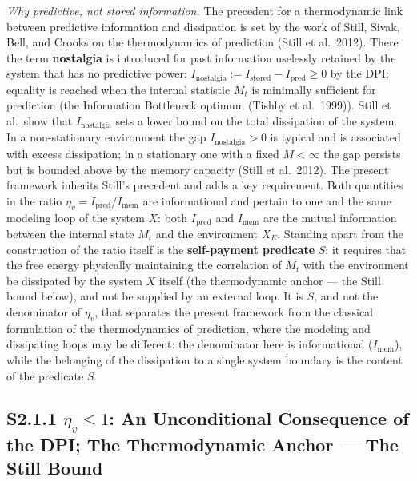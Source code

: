 \documentclass[pdflatex,sn-mathphys-ay]{sn-jnl}
\begin{document}
\emph{Why predictive, not stored information.} The precedent for a thermodynamic link between predictive information and dissipation is set by the work of Still, Sivak, Bell, and Crooks on the thermodynamics of prediction (Still et al.~2012). There the term \textbf{nostalgia} is introduced for past information uselessly retained by the system that has no predictive power: \(I_{\text{nostalgia}} := I_{\text{stored}} - I_{\text{pred}} \ge 0\) by the DPI; equality is reached when the internal statistic \(M_t\) is minimally sufficient for prediction (the Information Bottleneck optimum (Tishby et al.~1999)). Still et al.~show that \(I_{\text{nostalgia}}\) sets a lower bound on the total dissipation of the system. In a non-stationary environment the gap \(I_{\text{nostalgia}} > 0\) is typical and is associated with excess dissipation; in a stationary one with a fixed \(M < \infty\) the gap persists but is bounded above by the memory capacity (Still et al.~2012). The present framework inherits Still's precedent and adds a key requirement. Both quantities in the ratio \(\eta_v = I_{\text{pred}}/I_{\text{mem}}\) are informational and pertain to one and the same modeling loop of the system \(X\): both \(I_{\text{pred}}\) and \(I_{\text{mem}}\) are the mutual information between the internal state \(M_t\) and the environment \(X_E\). Standing apart from the construction of the ratio itself is the \textbf{self-payment predicate} \(S\): it requires that the free energy physically maintaining the correlation of \(M_t\) with the environment be dissipated by the system \(X\) itself (the thermodynamic anchor --- the Still bound below), and not be supplied by an external loop. It is \(S\), and not the denominator of \(\eta_v\), that separates the present framework from the classical formulation of the thermodynamics of prediction, where the modeling and dissipating loops may be different: the denominator here is informational (\(I_{\text{mem}}\)), while the belonging of the dissipation to a single system boundary is the content of the predicate \(S\).

\subsection*{\texorpdfstring{S2.1.1 \(\eta_v \le 1\): An Unconditional Consequence of the DPI; The Thermodynamic Anchor --- The Still Bound}{S2.1.1 \textbackslash eta\_v \textbackslash le 1: An Unconditional Consequence of the DPI; The Thermodynamic Anchor --- The Still Bound}}\label{s2.1.1-eta_v-le-1-an-unconditional-consequence-of-the-dpi-the-thermodynamic-anchor-the-still-bound}
\end{document}
